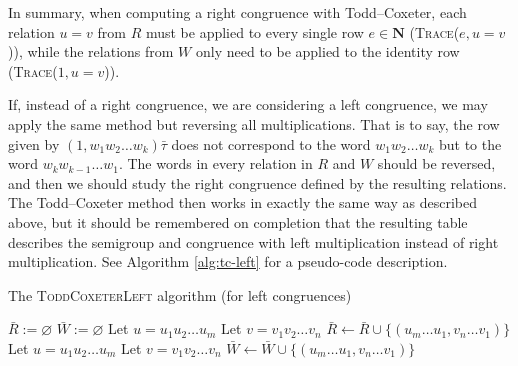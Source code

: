 In summary, when computing a right congruence with Todd--Coxeter, each relation
$u=v$ from $R$ must be applied to every single row $e \in \mathbf{N}$
(\textsc{Trace($e, u=v$)}), while the relations from $W$ only need to be applied
to the identity row (\textsc{Trace($1, u=v$)}).

If, instead of a right congruence, we are considering a left congruence, we may
apply the same method but reversing all multiplications.  That is to say, the
row given by $(1, w_1 w_2 \ldots w_k)\bar\tau$ does not correspond to the word
$w_1 w_2 \ldots w_k$ but to the word $w_k w_{k-1} \ldots w_1$.  The words in
every relation in $R$ and $W$ should be reversed, and then we should study the
right congruence defined by the resulting relations.  The Todd--Coxeter method
then works in exactly the same way as described above, but it should be
remembered on completion that the resulting table describes the semigroup and
congruence with left multiplication instead of right multiplication.  See
Algorithm \ref{alg:tc-left} for a pseudo-code description.

\begin{algorithm}
\caption{The \textsc{ToddCoxeterLeft} algorithm (for left congruences)}
\label{alg:tc-left}
\begin{algorithmic}[1]
\State $\bar R := \varnothing$
\State $\bar W := \varnothing$
  \State Let $u = u_1 u_2 \ldots u_m$ 
  \State Let $v = v_1 v_2 \ldots v_n$ 
  \State $\bar R \gets \bar R \cup \{(u_m \ldots u_1, v_n \ldots v_1)\}$
\EndFor
{}
  \State Let $u = u_1 u_2 \ldots u_m$ 
  \State Let $v = v_1 v_2 \ldots v_n$ 
  \State $\bar W \gets \bar W \cup \{(u_m \ldots u_1, v_n \ldots v_1)\}$
\EndFor
\State \Return {}
\EndProcedure
\end{algorithmic}
\end{algorithm}

